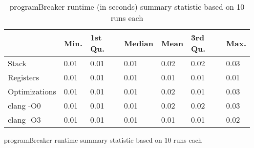\begin{table}[h!]
\centering
\begin{tabular}{p{}p{}p{}p{}p{}p{}p{}}
  \hline
 & Min. & 1st Qu. & Median & Mean & 3rd Qu. & Max. \\ 
  \hline
Stack & 0.01 & 0.01 & 0.01 & 0.02 & 0.02 & 0.03 \\ 
  Registers & 0.01 & 0.01 & 0.01 & 0.01 & 0.01 & 0.01 \\ 
  Optimizations & 0.01 & 0.01 & 0.01 & 0.02 & 0.01 & 0.03 \\ 
  clang -O0 & 0.01 & 0.01 & 0.01 & 0.02 & 0.02 & 0.03 \\ 
  clang -O3 & 0.01 & 0.01 & 0.01 & 0.01 & 0.01 & 0.02 \\ 
   \hline
\end{tabular}
\caption{programBreaker runtime summary statistic based on 10 runs each}
\caption{programBreaker runtime (in seconds) summary statistic based on 10 runs each}
\end{table}
